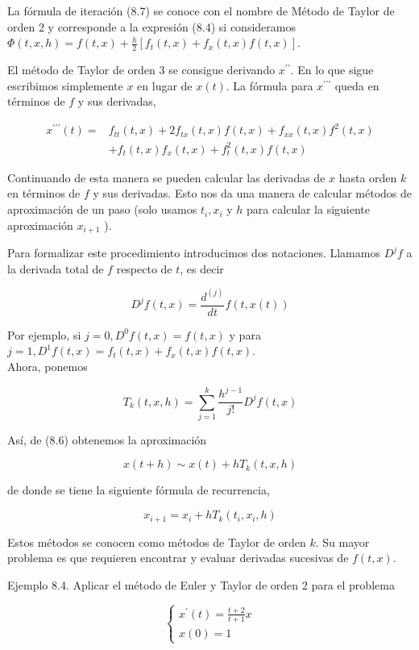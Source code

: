 \documentclass[10pt]{book}
\begin{document}
La fórmula de iteración (8.7) se conoce con el nombre de Método de Taylor de orden 2 y corresponde a la expresión (8.4) si consideramos $\Phi(t, x, h)=f(t, x)+\frac{h}{2}\left[f_{t}(t, x)+f_{x}(t, x) f(t, x)\right]$.

El método de Taylor de orden 3 se consigue derivando $x^{\prime \prime}$. En lo que sigue escribimos simplemente $x$ en lugar de $x(t)$. La fórmula para $x^{\prime \prime \prime}$ queda en términos de $f$ y sus derivadas,

$$
\begin{aligned}
x^{\prime \prime \prime}(t)= & f_{t t}(t, x)+2 f_{t x}(t, x) f(t, x)+f_{x x}(t, x) f^{2}(t, x) \\
& +f_{t}(t, x) f_{x}(t, x)+f_{t}^{2}(t, x) f(t, x)
\end{aligned}
$$

Continuando de esta manera se pueden calcular las derivadas de $x$ hasta orden $k$ en términos de $f$ y sus derivadas. Esto nos da una manera de calcular métodos de aproximación de un paso (solo usamos $t_{i}, x_{i}$ y $h$ para calcular la siguiente aproximación $x_{i+1}$ ).

Para formalizar este procedimiento introducimos dos notaciones. Llamamos $D^{j} f$ a la derivada total de $f$ respecto de $t$, es decir

$$
D^{j} f(t, x)=\frac{d^{(j)}}{d t} f(t, x(t))
$$

Por ejemplo, si $j=0, D^{0} f(t, x)=f(t, x)$ y para $j=1, D^{1} f(t, x)=f_{t}(t, x)+f_{x}(t, x) f(t, x)$.\\
Ahora, ponemos


\begin{equation*}
T_{k}(t, x, h)=\sum_{j=1}^{k} \frac{h^{j-1}}{j!} D^{j} f(t, x) \tag{8.8}
\end{equation*}


Así, de (8.6) obtenemos la aproximación

$$
x(t+h) \sim x(t)+h T_{k}(t, x, h)
$$

de donde se tiene la siguiente fórmula de recurrencia,

$$
x_{i+1}=x_{i}+h T_{k}\left(t_{i}, x_{i}, h\right)
$$

Estos métodos se conocen como métodos de Taylor de orden $k$. Su mayor problema es que requieren encontrar y evaluar derivadas sucesivas de $f(t, x)$.

Ejemplo 8.4. Aplicar el método de Euler y Taylor de orden 2 para el problema

$$
\left\{\begin{array}{l}
x^{\prime}(t)=\frac{t+2}{t+1} x \\
x(0)=1
\end{array}\right.
$$
\end{document}
